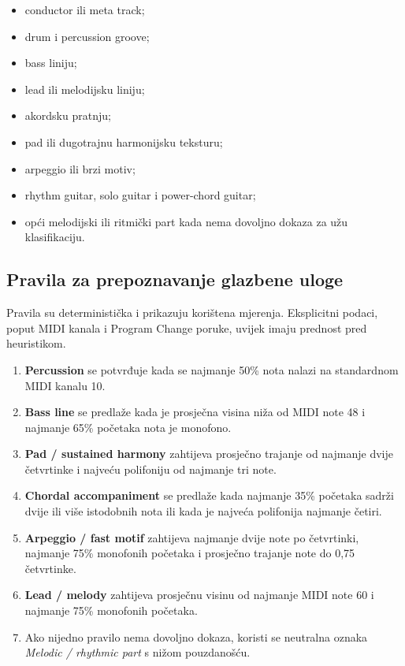\documentclass[11pt]{article}
\begin{document}
\begin{itemize}
    \item conductor ili meta track;
    \item drum i percussion groove;
    \item bass liniju;
    \item lead ili melodijsku liniju;
    \item akordsku pratnju;
    \item pad ili dugotrajnu harmonijsku teksturu;
    \item arpeggio ili brzi motiv;
    \item rhythm guitar, solo guitar i power-chord guitar;
    \item opći melodijski ili ritmički part kada nema dovoljno dokaza za užu
    klasifikaciju.
\end{itemize}

\subsection{Pravila za prepoznavanje glazbene uloge}

Pravila su deterministička i prikazuju korištena mjerenja. Eksplicitni podaci,
poput MIDI kanala i Program Change poruke, uvijek imaju prednost pred
heuristikom.

\begin{enumerate}[label=D\arabic*.]
    \item \textbf{Percussion} se potvrđuje kada se najmanje 50\% nota nalazi na
    standardnom MIDI kanalu 10.

    \item \textbf{Bass line} se predlaže kada je prosječna visina niža od MIDI
    note 48 i najmanje 65\% početaka nota je monofono.

    \item \textbf{Pad / sustained harmony} zahtijeva prosječno trajanje od
    najmanje dvije četvrtinke i najveću polifoniju od najmanje tri note.

    \item \textbf{Chordal accompaniment} se predlaže kada najmanje 35\%
    početaka sadrži dvije ili više istodobnih nota ili kada je najveća
    polifonija najmanje četiri.

    \item \textbf{Arpeggio / fast motif} zahtijeva najmanje dvije note po
    četvrtinki, najmanje 75\% monofonih početaka i prosječno trajanje note do
    0,75 četvrtinke.

    \item \textbf{Lead / melody} zahtijeva prosječnu visinu od najmanje MIDI
    note 60 i najmanje 75\% monofonih početaka.

    \item Ako nijedno pravilo nema dovoljno dokaza, koristi se neutralna oznaka
    \emph{Melodic / rhythmic part} s nižom pouzdanošću.
\end{enumerate}
\end{document}

